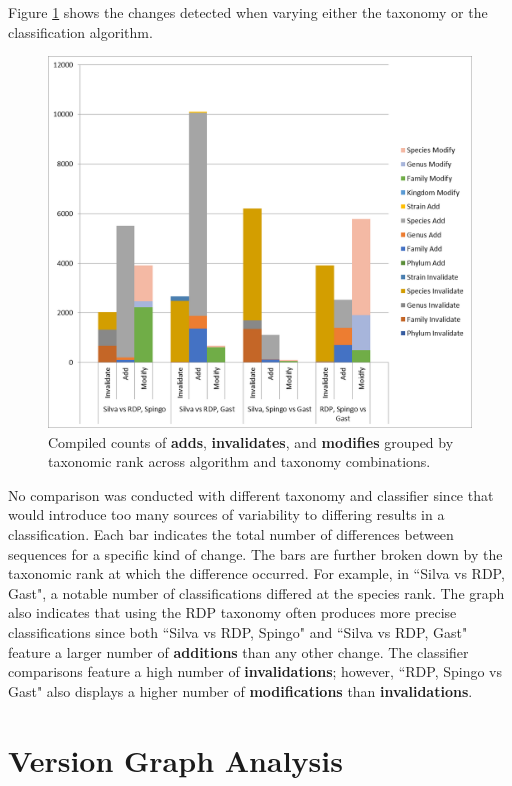 Figure \ref{mbvl_chart} shows the changes detected when varying either the taxonomy or the classification algorithm.
\begin{figure}
	\centering
	\includegraphics[scale=0.75]{figures/mbvl_chart.png}
	\caption{Compiled counts of \textbf{adds}, \textbf{invalidates}, and \textbf{modifies} grouped by taxonomic rank across algorithm and taxonomy combinations.}
	\label{mbvl_chart}
\end{figure}
No comparison was conducted with different taxonomy and classifier since that would introduce too many sources of variability to differing results in a classification.
Each bar indicates the total number of differences between sequences for a specific kind of change.
The bars are further broken down by the taxonomic rank at which the difference occurred.
For example, in ``Silva vs RDP, Gast", a notable number of classifications differed at the species rank.
The graph also indicates that using the RDP taxonomy often produces more precise classifications since both ``Silva vs RDP, Spingo" and ``Silva vs RDP, Gast" feature a larger number of \textbf{additions} than any other change.
The classifier comparisons feature a high number of \textbf{invalidations}; however, ``RDP, Spingo vs Gast" also displays a higher number of \textbf{modifications} than \textbf{invalidations}.

\section{Version Graph Analysis}

